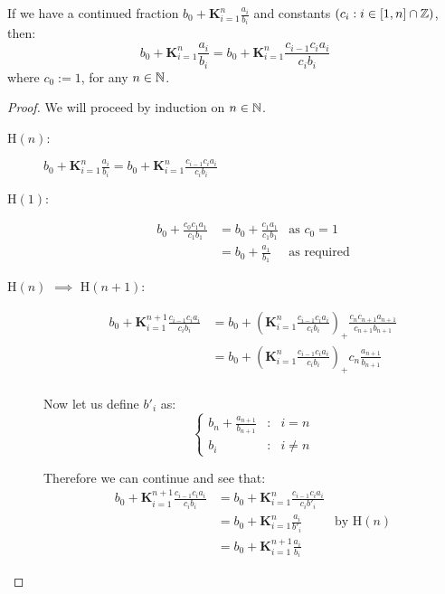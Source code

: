 \begin{equiv cont frac}
\label{THM_"equiv cont frac"}
If we have a continued fraction \(b_0 + \mathbf{K}_{i=1}^n\frac{a_i}{b_i}\) and constants \((c_i : i \in [1, n] \cap \mathbb{Z})\), then:
\[b_0 + \mathbf{K}_{i=1}^n\frac{a_i}{b_i} = b_0 + \mathbf{K}_{i=1}^n\frac{c_{i-1}c_ia_i}{c_ib_i}\]
where \(c_0 := 1\), for any \(n \in \mathbb{N}\).
\end{equiv cont frac}
\begin{proof}
We will proceed by induction on \(n \in \mathbb{N}\).\\
\begin{description}
\item[\textrm{H\((n)\):}] \(b_0 + \mathbf{K}_{i=1}^n\frac{a_i}{b_i} = b_0 + \mathbf{K}_{i=1}^n\frac{c_{i-1}c_ia_i}{c_ib_i}\)
\item[\textrm{H\((1)\):}]
	\begin{align*}
		b_0 + \frac{c_0c_1a_1}{c_1b_1} 
			&= b_0 + \frac{c_1a_1}{c_1b_1} &\textrm{as \(c_0 = 1\)}\\
			&= b_0 + \frac{a_1}{b_1} &\textrm{as required}
	\end{align*}
\item[\textrm{H\((n)\) \(\implies\) H\((n+1)\):}]
	\begin{align*}
		b_0 + \mathbf{K}_{i=1}^{n+1}\frac{c_{i-1}c_ia_i}{c_ib_i}
			&= b_0 + \left(\mathbf{K}_{i=1}^n
				\frac{c_{i-1}c_ia_i}{c_ib_i}\right)_+
				\frac{c_nc_{n+1}a_{n+1}}{c_{n+1}b_{n+1}}\\
			&= b_0 + \left(\mathbf{K}_{i=1}^n
				\frac{c_{i-1}c_ia_i}{c_ib_i}\right)_+
				c_n\frac{a_{n+1}}{b_{n+1}}\\
	\end{align*}

Now let us define \(b'_i\) as:
\begin{displaymath}
\left\{
	\begin{array}{lcl}
		b_n + \frac{a_{n+1}}{b_{n+1}} &:& i = n\\
		b_i &:& i \neq n
	\end{array}
\right.
\end{displaymath}

Therefore we can continue and see that:
	\begin{align*}
		b_0 + \mathbf{K}_{i=1}^{n+1}\frac{c_{i-1}c_ia_i}{c_ib_i}
			&= b_0 + \mathbf{K}_{i=1}^n\frac{c_{i-1}c_ia_i}{c_ib'_i}\\
			&= b_0 + \mathbf{K}_{i=1}^n \frac{a_i}{b'_i}
				&\textrm{by H\((n)\)}\\
			&= b_0 + \mathbf{K}_{i=1}^{n+1}\frac{a_i}{b_i}
	\end{align*}
\end{description}
\end{proof}

